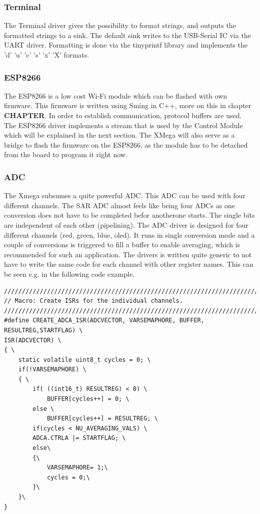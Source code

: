 \subsubsection{Terminal}
The Terminal driver gives the possibility to format strings, and outputs the formatted strings to a sink. The default sink writes to the USB-Serial IC via the UART driver. Formatting is done via the tinyprintf library\cite{sparetimelabs:tinyprintf} and implements the 'd' 'u' 'c' 's' 'x' 'X' formats.
\subsubsection{ESP8266}
The ESP8266 is a low cost Wi-Fi module which can be flashed with own firmware. This firmware is written using Sming in C++, more on this in chapter \textbf{CHAPTER}. In order to establish communication, protocol buffers are used. The ESP8266 driver implements a stream that is used by the Control Module which will be explained in the next section. The XMega will also serve as a bridge to flash the firmware on the ESP8266, as the module has to be detached from the board to program it right now. 

\subsubsection{ADC}
The Xmega subsumes a quite powerful ADC. This ADC can be used with four
different channels. The SAR ADC almost feels like being four ADCs as one
conversion does not have to be completed befor anotherone starts. The single
bits are independent of each other (pipelining). The ADC driver is designed for
four different channels (red, green, blue, oled). It runs in single conversion
mode and a couple of conversions is triggered to fill a buffer to enable
averaging, which is recommended for such an application. The drivers is written
quite generic to not have to write the same code for each channel with other
register names. This can be seen e.g. in the following code example. 

\begin{verbatim}
/////////////////////////////////////////////////////////////////////////////////
// Macro: Create ISRs for the individual channels.
/////////////////////////////////////////////////////////////////////////////////
#define CREATE_ADCA_ISR(ADCVECTOR, VARSEMAPHORE, BUFFER, RESULTREG,STARTFLAG) \ 
ISR(ADCVECTOR) \ 
{ \ 
	static volatile uint8_t cycles = 0; \
	if(!VARSEMAPHORE) \ 
	{ \ 
		if( ((int16_t) RESULTREG) < 0) \
			BUFFER[cycles++] = 0; \ 
		else \ 
			BUFFER[cycles++] = RESULTREG; \ 
		if(cycles < NU_AVERAGING_VALS) \ 
		ADCA.CTRLA |= STARTFLAG; \ 
		else\ 
		{\ 
			VARSEMAPHORE= 1;\ 
			cycles = 0;\ 
		}\ 
	}\
}
\end{verbatim}

